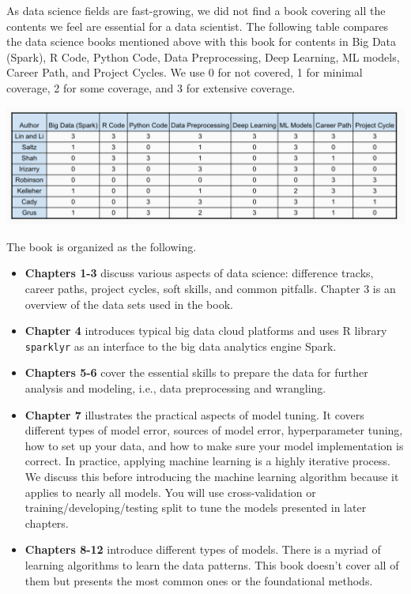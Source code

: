 \documentclass[
  12pt,
]{krantz}
\providecommand{\tightlist}{%
  \setlength{\itemsep}{0pt}\setlength{\parskip}{0pt}}
\begin{document}
As data science fields are fast-growing, we did not find a book covering all the contents we feel are essential for a data scientist. The following table compares the data science books mentioned above with this book for contents in Big Data (Spark), R Code, Python Code, Data Preprocessing, Deep Learning, ML models, Career Path, and Project Cycles. We use 0 for not covered, 1 for minimal coverage, 2 for some coverage, and 3 for extensive coverage.

\begin{center}\includegraphics[width=1\linewidth]{images/preface_coverage} \end{center}

The book is organized as the following.

\begin{itemize}
\tightlist
\item
  \textbf{Chapters 1-3} discuss various aspects of data science: difference tracks, career paths, project cycles, soft skills, and common pitfalls. Chapter 3 is an overview of the data sets used in the book.
\item
  \textbf{Chapter 4} introduces typical big data cloud platforms and uses R library \texttt{sparklyr}  as an interface to the big data analytics engine Spark.
\item
  \textbf{Chapters 5-6} cover the essential skills to prepare the data for further analysis and modeling, i.e., data preprocessing and wrangling.
\item
  \textbf{Chapter 7} illustrates the practical aspects of model tuning. It covers different types of model error, sources of model error, hyperparameter tuning, how to set up your data, and how to make sure your model implementation is correct. In practice, applying machine learning is a highly iterative process. We discuss this before introducing the machine learning algorithm because it applies to nearly all models. You will use cross-validation or training/developing/testing split to tune the models presented in later chapters.
\item
  \textbf{Chapters 8-12} introduce different types of models. There is a myriad of learning algorithms to learn the data patterns. This book doesn't cover all of them but presents the most common ones or the foundational methods.
\end{itemize}
\end{document}
